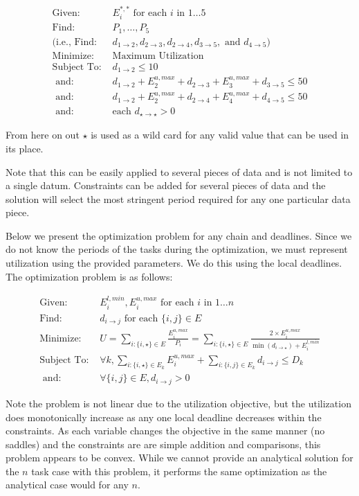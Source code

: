 \begin{align*}
	\text{Given: }& E^{*,*}_i \text{ for each } i \text{ in } 1 \ldots 5\\
	\text{Find: }& P_1, \ldots, P_5\\
	\text{(i.e., Find: }& d_{1 \to 2}, d_{2 \to 3}, d_{2 \to 4}, d_{3 \to 5}, \text{ and } d_{4 \to 5}\text{)}\\
	\text{Minimize: }& \text{Maximum Utilization} \\
	\text{Subject To: }& d_{1 \to 2} \le 10 \\
	\text{ and: }& d_{1 \to 2} + E^{u,max}_2 + d_{2 \to 3} + E^{u,max}_3 + d_{3 \to 5} \le 50 \\
	\text{ and: }& d_{1 \to 2} + E^{u,max}_2 + d_{2 \to 4} + E^{u,max}_4 + d_{4 \to 5} \le 50 \\
	\text{ and: }& \text{each } d_{\star \to \star} > 0
\end{align*}

\noindent From here on out $\star$ is used as a wild card for any valid value that can be used in its place.

Note that this can be easily applied to several pieces of data and is not limited to a single datum. Constraints can be added for several pieces of data and the solution will select the most stringent period required for any one particular data piece.

Below we present the optimization problem for any chain and deadlines. Since we do not know the periods of the tasks during the optimization, we must represent utilization using the provided parameters. We do this using the local deadlines. The optimization problem is as follows:

\begin{align*}
	\text{Given: }& E^{l,min}_i, E^{u,max}_i \text{ for each } i \text{ in } 1 \ldots n\\
	\text{Find: }& d_{i \to j} \text{ for each } \{i,j\} \in E\\
	\text{Minimize: }& U = \sum_{i : \{i,\star\} \in E} \frac{E^{u,max}_i}{P_i} = \sum_{i : \{i,\star\} \in E} \frac{2 \times E^{u,max}_i}{\min(d_{i \to \star}) + E^{l,min}_i} \\
	\text{Subject To: }& \forall k, \sum_{i : \{i,\star\} \in E_k} E^{u,max}_i + \sum_{i : \{i,j\} \in E_k} d_{i \to j} \le D_k \\
	\text{ and: }& \forall{\{i,j\} \in E}, d_{i \to j} > 0
\end{align*}

Note the problem is not linear due to the utilization objective, but the utilization does monotonically increase as any one local deadline decreases within the constraints. As each variable changes the objective in the same manner (no saddles) and the constraints are are simple addition and comparisons, this problem appears to be convex. While we cannot provide an analytical solution for the $n$ task case with this problem, it performs the same optimization as the analytical case would for any $n$.

